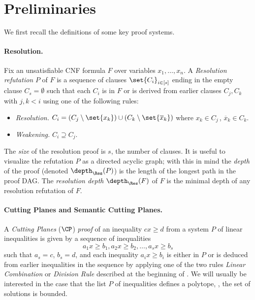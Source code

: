 \section{Preliminaries} 
\label{sec:prelims}
%


We first recall the definitions of some key proof systems.

\paragraph{Resolution.} Fix an unsatisfiable CNF formula $F$ over variables $x_1, \ldots, x_n$. 
A \emph{Resolution refutation} $P$ of $F$ is a sequence of clauses $\set{C_i}_{i \in [s]}$ ending in the empty clause $C_s = \emptyset$ such that each $C_i$ is in $F$ or is derived from earlier clauses $C_j, C_k$ with $j, k < i$ using one of the following rules:
\begin{itemize}
	\item \emph{Resolution.} $C_i = (C_j \setminus \set{x_k}) \cup (C_k \setminus \set{\overline x_k})$ where $x_k \in C_j\,$, $\overline x_k \in C_k$.
	\item \emph{Weakening.} $C_i \supseteq C_j$.
\end{itemize}
The \emph{size} of the resolution proof is $s$, the number of clauses.
It is useful to visualize the refutation $P$ as a directed acyclic graph; with this in mind the \emph{depth} of the proof (denoted $\depth_{\Res}(P)$) is the length of the longest path in the proof DAG.
The \emph{resolution depth} $\depth_{\Res}(F)$ of $F$ is the minimal depth of any resolution refutation of $F$.

\paragraph{Cutting Planes and Semantic Cutting Planes.} A \emph{Cutting Planes} ($\CP$)
\emph{proof} of an inequality $cx \geq d$ from a
%
system $P$ of linear inequalities %
is given by a sequence of inequalities \[ a_1x \geq b_1, a_2x \geq b_2, \ldots, a_s x \geq b_s \]
such that $a_s = c$, $b_s = d$, and each inequality $a_ix \geq b_i$ is either in $P$ or is deduced from earlier inequalities in the sequence by applying one of the two rules \emph{Linear Combination} or \emph{Division Rule} described at the beginning of .
We will usually be interested in the case that the
%
list $P$ of inequalities   %
defines a polytope, %
%
\ie, the set of solutions is bounded.  %
%
%
%

